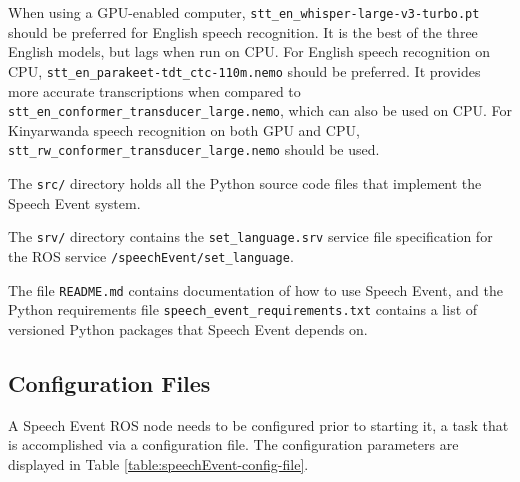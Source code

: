 \documentclass{CSSRforAfrica}
\begin{document}
When using a GPU-enabled computer, \texttt{stt\_en\_whisper-large-v3-turbo.pt} should be preferred for English speech recognition. It is the best of the three English models, but lags when run on CPU. For English speech recognition on CPU, \texttt{stt\_en\_parakeet-tdt\_ctc-110m.nemo} should be preferred. It provides more accurate transcriptions when compared to \\\texttt{stt\_en\_conformer\_transducer\_large.nemo}, which can also be used on CPU. For Kinyarwanda speech recognition on both GPU and CPU, \texttt{stt\_rw\_conformer\_transducer\_large.nemo} should be used.

The \texttt{src/} directory holds all the Python source code files that implement the Speech Event system.

The \texttt{srv/} directory contains the \texttt{set\_language.srv} service file specification for the ROS service \texttt{/speechEvent/set\_language}.

The file \texttt{README.md} contains documentation of how to use Speech Event,  and the Python requirements file \texttt{speech\_event\_requirements.txt} contains a list of versioned Python packages that Speech Event depends on.

\newpage
\subsection{Configuration Files}

A Speech Event ROS node needs to be configured prior to starting it, a task that is accomplished via a configuration file. The configuration parameters are displayed in Table \ref{table:speechEvent-config-file}.
\end{document}
